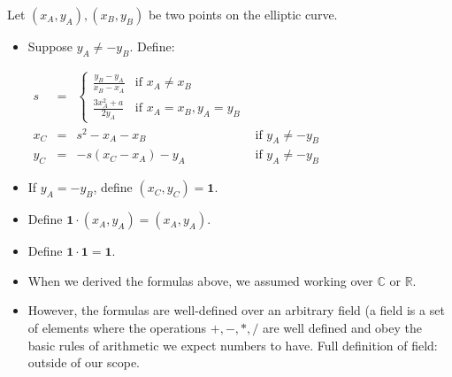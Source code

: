 \begin{frame}
\begin{emptyTheorem}
Let $\left(x_A, y_A\right), \left(x_B, y_B\right)$ be two points on the elliptic curve. 
\begin{itemize}
\item Suppose $y_A\neq -y_B$. Define:

$\begin{array}{rcl|l}
s&=& \left\{ \begin{array}{ll}\displaystyle\frac{y_B-y_A}{x_B-x_A} &\displaystyle\text{if } x_A\neq x_B \\\displaystyle \frac{3x_A^2+a}{2y_A}&\text{if }x_A=x_B, y_A=y_B \end{array} \right.\\
x_C &=& s^2 - x_A-x_B &\text{if } y_A\neq -y_B\\
y_C &=& -s(x_C-x_A)-y_A&\text{if } y_A\neq -y_B 
\end{array}
$
\item If $y_A= -y_B$, define $(x_C, y_C) = \mathbf 1$.
\item Define $\mathbf 1\cdot \left(x_A, y_A\right) = \left(x_A,y_A\right)$.
\item Define $\mathbf 1\cdot \mathbf 1 = \mathbf 1$.

\end{itemize}
\end{emptyTheorem}

\begin{itemize}
\item<2-> When we derived the formulas above, we assumed working over $\mathbb C$ or $\mathbb R$.
\item<3-> However, the formulas are well-defined over an arbitrary field (a field is a set of elements where the operations $+, -, *, /$ are well defined and obey the basic rules of arithmetic we expect numbers to have. Full definition of field: outside of our scope.
\end{itemize}
\end{frame}